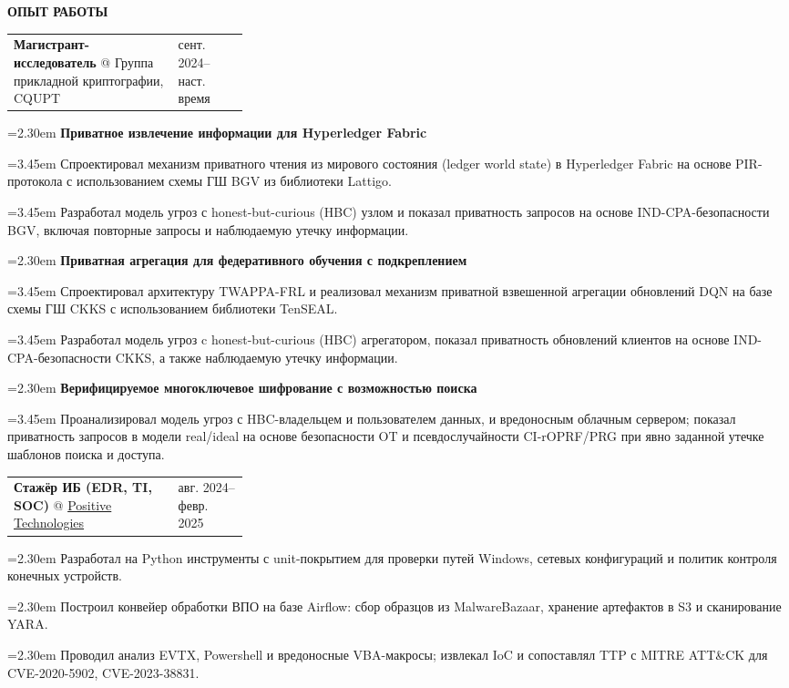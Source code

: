 \documentclass[11pt,a4paper]{article}
\makeatletter
\newcommand{\cvrow}[2]{%
  \noindent
  \begin{minipage}[t]{0.145\textwidth}
    \vspace{0pt}%
    \raggedright
    \fontsize{8.5}{10}\selectfont
    \bfseries\MakeUppercase{#1}
  \end{minipage}%
  \hfill
  \begin{minipage}[t]{0.835\textwidth}
    \vspace{0pt}%
    #2
  \end{minipage}\par
}
\newcommand{\workentry}[2]{%
  \noindent
  \begin{tabularx}{\linewidth}
    {@{}X@{\hspace{0.8em}}
    >{\raggedleft\arraybackslash}p{0.30\linewidth}@{}}
    #1 & \small #2
  \end{tabularx}\par
  \vspace{0.15em}
}
\newcommand{\workproject}[1]{%
  \noindent
  \hangindent=2.30em
  \hangafter=1
  \hspace*{1.15em}\makebox[1.15em][l]{$\diamond$}#1\par
  \vspace{0.12em}
}
\newcommand{\workprojectdetail}[1]{%
  \noindent
  \hangindent=3.45em
  \hangafter=1
  \hspace*{2.30em}\makebox[1.15em][l]{--}#1\par
  \vspace{0.08em}
}
\makeatother
\begin{document}
\vspace{0.50em}

\cvrow{Опыт работы}{%
  \workentry
    {\textbf{Магистрант-исследователь} @ Группа прикладной криптографии, CQUPT}
    {сент. 2024--наст. время}

  \workproject{\textbf{Приватное извлечение информации для Hyperledger Fabric}}
  \workprojectdetail{Спроектировал механизм приватного чтения из мирового состояния 
  (ledger world state) в Hyperledger Fabric на основе PIR-протокола с использованием схемы ГШ 
  BGV из библиотеки Lattigo.}
  \workprojectdetail{Разработал модель угроз с honest-but-curious (HBC) узлом
  и показал приватность запросов на основе IND-CPA-безопасности
  BGV, включая повторные запросы и наблюдаемую утечку информации.}

  \workproject{\textbf{Приватная агрегация для федеративного обучения с подкреплением}}
  \workprojectdetail{Спроектировал архитектуру TWAPPA-FRL и реализовал
  механизм приватной взвешенной агрегации обновлений DQN на базе схемы
  ГШ CKKS с использованием библиотеки TenSEAL.}
  \workprojectdetail{Разработал модель угроз c honest-but-curious (HBC) агрегатором, показал
  приватность обновлений клиентов на основе IND-CPA-безопасности CKKS, а также наблюдаемую 
  утечку информации.}

  \workproject{\textbf{Верифицируемое многоключевое шифрование с возможностью поиска}}
  \workprojectdetail{Проанализировал модель угроз с HBC-владельцем и пользователем данных,
  и вредоносным облачным сервером; показал приватность запросов в модели
  real/ideal на основе безопасности OT и псевдослучайности CI-rOPRF/PRG
  при явно заданной утечке шаблонов поиска и доступа.}
}

\vspace{0.50em}

\cvrow{}{%
  \workentry
    {\textbf{Стажёр ИБ (EDR, TI, SOC)} @
    \href{https://global.ptsecurity.com/en/}{Positive Technologies}}
    {авг. 2024--февр. 2025}

  \workproject{Разработал на Python инструменты с unit-покрытием для
  проверки путей Windows, сетевых конфигураций и политик контроля конечных устройств.}
  \workproject{Построил конвейер обработки ВПО на базе Airflow:
  сбор образцов из MalwareBazaar, хранение артефактов в S3 и сканирование YARA.}
  \workproject{Проводил анализ EVTX, Powershell и вредоносные VBA-макросы;
  извлекал IoC и сопоставлял TTP с MITRE ATT\&CK для CVE-2020-5902, CVE-2023-38831.}
}
\end{document}
